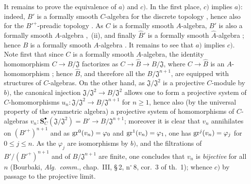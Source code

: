 \begin{env}[19.5.4.4]
\label{0.19.5.4.4}
It remains to prove the equivalence of $a)$ and $c)$.
In the first place, $c)$ implies $a)$: indeed, $B'$ is a formally smooth $C$-algebra for the discrete topology , hence also for the ${B'}^+$-preadic topology .
As $C$ is a formally smooth $A$-algebra, $B'$ is also a formally smooth $A$-algebra ,~{\rm(ii)}, and finally $\widehat{B}'$ is a formally smooth $\widehat{A}$-algebra ; hence $B$ is a formally smooth $A$-algebra .
It remains to see that $a)$ implies $c)$.
Note first that since $C$ is a formally smooth $A$-algebra, the identity homomorphism $C\to B/\mathfrak{J}$ factorizes as $C\to\widehat{B}\to B/\mathfrak{J}$, where $C\to\widehat{B}$ is an $A$-homomorphism ;
hence $\widehat{B}$, and therefore all the $B/\mathfrak{J}^{n+1}$, are equipped with structures of $C$-algebras.
On the other hand, as $\mathfrak{J}/\mathfrak{J}^2$ is a projective $C$-module by $b)$, the canonical injection $\mathfrak{J}/\mathfrak{J}^2\to B/\mathfrak{J}^2$ allows one to form a projective system of $C$-homomorphisms $u_n:\mathfrak{J}/\mathfrak{J}^2\to B/\mathfrak{J}^{n+1}$ for $n\geq 1$, hence also (by the universal property of the symmetric algebra) a projective system of homomorphisms of $C$-algebras $v_n:\mathbf{S}_C^\bullet(\mathfrak{J}/\mathfrak{J}^2)=B'\to B/\mathfrak{J}^{n+1}$;
moreover it is clear that $v_n$ annihilates on $({B'}^+)^{n+1}$ and as $\operatorname{gr}^0(v_n)=\varphi_0$ and $\operatorname{gr}^1(v_n)=\varphi_1$, one has $\operatorname{gr}^j(v_n)=\varphi_j$ for $0\leq j\leq n$.
As the $\varphi_j$ are isomorphisms by $b)$, and the filtrations of $B'/({B'}^+)^{n+1}$ and of $B/\mathfrak{J}^{n+1}$ are finite, one concludes that $v_n$ is \emph{bijective} for
all $n$ (Bourbaki, \emph{Alg.\ comm.}, chap.~III, \S\,2, n$^\circ$\,8, cor.~3 of th.~1); whence $c)$ by passage to the projective limit.
\end{env}

